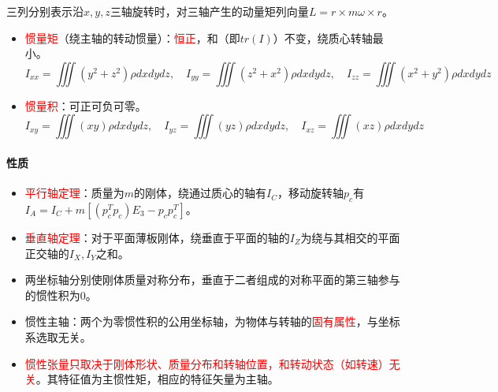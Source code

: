 \documentclass[
12pt, %
a4paper, 
oneside, %
]{scrartcl}
\begin{document}
三列分别表示沿$ x, y, z $三轴旋转时，对三轴产生的动量矩列向量$ L = r \times m \omega \times r $。
\begin{itemize}
\item \textcolor{red}{惯量矩}（绕主轴的转动惯量）：\textcolor{red}{恒正}，和（即$ tr(I) $）不变，绕质心转轴最小。
$$ I_{xx} = \iiint (y^2 + z^2)\rho dxdydz, \quad I_{yy} = \iiint (z^2 + x^2)\rho dxdydz, \quad I_{zz} = \iiint (x^2 + y^2)\rho dxdydz $$
\item \textcolor{red}{惯量积}：可正可负可零。
$$ I_{xy} = \iiint (xy)\rho dxdydz, \quad I_{yz} = \iiint (yz)\rho dxdydz, \quad I_{xz} = \iiint (xz)\rho dxdydz $$
\end{itemize} 
\paragraph{性质}
\begin{itemize}
\item \textcolor{red}{平行轴定理}：质量为$ m $的刚体，绕通过质心的轴有$ I_C $，移动旋转轴$ p_c $有\\$ I_A = I_C + m[(p_c^T p_c)E_3 - p_c p_c^T] $。
\item \textcolor{red}{垂直轴定理}：对于平面薄板刚体，绕垂直于平面的轴的$ I_Z $为绕与其相交的平面正交轴的$ I_X, I_Y $之和。
\item 两坐标轴分别使刚体质量对称分布，垂直于二者组成的对称平面的第三轴参与的惯性积为$ 0 $。
\item 惯性主轴：两个为零惯性积的公用坐标轴，为物体与转轴的\textcolor{red}{固有属性}，与坐标系选取无关。
\item \textcolor{red}{惯性张量只取决于刚体形状、质量分布和转轴位置，和转动状态（如转速）无关}。其特征值为主惯性矩，相应的特征矢量为主轴。
\end{itemize}
\end{document}
